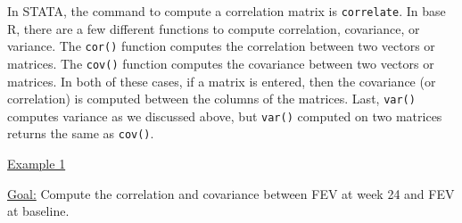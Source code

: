 \documentclass[landscape]{article}
\begin{document}
In STATA, the command to compute a correlation matrix is \texttt{correlate}. In base R, there are a few different functions to compute correlation, covariance, or variance. The \texttt{cor()} function computes the correlation between two vectors or matrices. The \texttt{cov()} function computes the covariance between two vectors or matrices. In both of these cases, if a matrix is entered, then the covariance (or correlation) is computed between the columns of the matrices. Last, \texttt{var()} computes variance as we discussed above, but \texttt{var()} computed on two matrices returns the same as \texttt{cov()}.

\noindent \underline{Example 1}

\underline{Goal:} Compute the correlation and covariance between FEV at week 24 and FEV at baseline.
\end{document}

